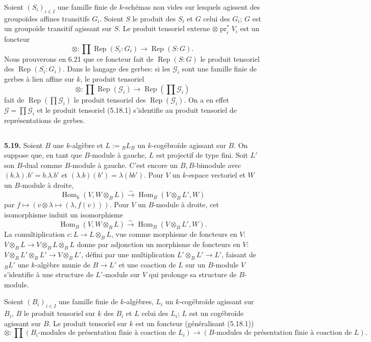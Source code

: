 \documentclass[12pt,a4paper]{article}
\theoremstyle{plain}
\theoremstyle{definition}
\theoremstyle{remark}
\DeclareMathOperator{\Hom}{Hom}
\DeclareMathOperator{\pr}{pr}
\DeclareMathOperator{\Rep}{Rep}
\begin{document}
Soient $(S_i)_{i \in I}$ une famille finie de $k$-schémas non vides sur lesquels agissent des groupoïdes affines transitifs $G_i$. Soient $S$ le produit des $S_i$ et $G$ celui des $G_i$; $G$ est un groupoïde transitif agissant sur $S$. Le produit tensoriel externe $\otimes \pr_i^* V_i$ est un foncteur
\begin{equation}\label{eq:5.18.1}
\otimes : \prod \Rep(S_i : G_i) \longrightarrow \Rep(S : G).
\end{equation}
Nous prouverons en 6.21 que ce foncteur fait de $\Rep(S:G)$ le produit tensoriel des $\Rep(S_i:G_i)$. Dans le langage des gerbes: si les $\mathcal{G}_i$ sont une famille finie de gerbes à lien affine sur $k$, le produit tensoriel
\[
\otimes : \prod \Rep(\mathcal{G}_i) \to \Rep(\prod \mathcal{G}_i)
\]
fait de $\Rep(\prod \mathcal{G}_i)$ le produit tensoriel des $\Rep(\mathcal{G}_i)$. On a en effet $\mathcal{G} = \prod \mathcal{G}_i$ et le produit tensoriel (5.18.1) s'identifie au produit tensoriel de représentations de gerbes.

\subsection{}

\textbf{5.19.} Soient $B$ une $k$-algèbre et $L := {}_B L_B$ un $k$-cogébroïde agissant sur $B$. On suppose que, en tant que $B$-module à gauche, $L$ est projectif de type fini. Soit $L'$ son $B$-dual comme $B$-module à gauche. C'est encore un $B,B$-bimodule avec $(b.\lambda).b' = b.\lambda.b'$ et $(\lambda.b)(b') = \lambda(bb')$. Pour $V$ un $k$-espace vectoriel et $W$ un $B$-module à droite,
\[
\Hom_k(V, W \otimes_B L) \xrightarrow{\sim} \Hom_B(V \otimes_B L', W)
\]
par $f \mapsto (v \otimes \lambda \mapsto (\lambda, f(v)))$. Pour $V$ un $B$-module à droite, cet isomorphisme induit un isomorphisme
\[
\Hom_B(V, W \otimes_B L) \xrightarrow{\sim} \Hom_B(V \otimes_B L', W).
\]
La comultiplication $c : L \to L \otimes_B L$, vue comme morphisme de foncteurs en $V$: $V \otimes_B L \to V \otimes_B L \otimes_B L$ donne par adjonction un morphisme de foncteurs en $V$: $V \otimes_B L' \otimes_B L' \to V \otimes_B L'$, défini par une multiplication $L' \otimes_B L' \to L'$, faisant de $_B L'$ une $k$-algèbre munie de $B \to L'$ et une coaction de $L$ sur un $B$-module $V$ s'identifie à une structure de $L'$-module sur $V$ qui prolonge sa structure de $B$-module.

Soient $(B_i)_{i \in I}$ une famille finie de $k$-algèbres, $L_i$ un $k$-cogébroïde agissant sur $B_i$, $B$ le produit tensoriel sur $k$ des $B_i$ et $L$ celui des $L_i$; $L$ est un cogébroïde agissant sur $B$. Le produit tensoriel sur $k$ est un foncteur (généralisant (5.18.1))
\begin{equation}\label{eq:5.19.1}
\otimes : \prod (B_i\text{-modules de présentation finie à coaction de } L_i) \longrightarrow (B\text{-modules de présentation finie à coaction de } L).
\end{equation}
\end{document}
